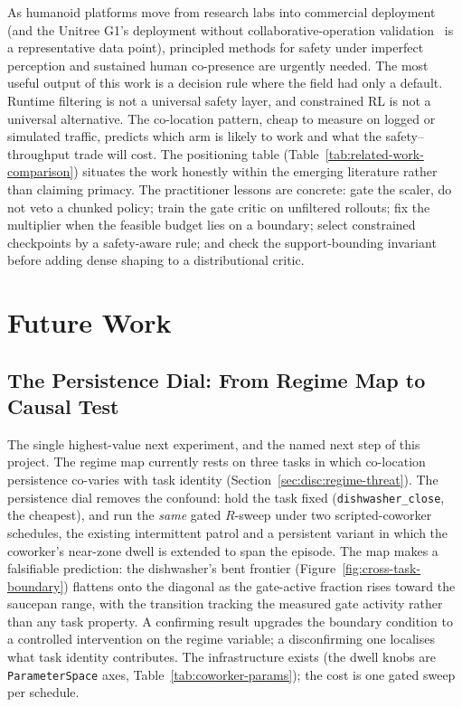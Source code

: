 \documentclass[11pt,a4paper]{report}
\begin{document}
\noindent
As humanoid platforms move from research labs into commercial
deployment (and the Unitree G1's deployment without
collaborative-operation validation~\cite{unitree_g1,hartmann2026iso}
is a representative data point),
principled methods for safety under imperfect perception and
sustained human co-presence are urgently needed. The most useful
output of this work is a decision rule where the field had only a
default. Runtime filtering is not a universal safety layer, and
constrained RL is not a universal alternative. The co-location
pattern, cheap to measure on logged or simulated traffic, predicts
which arm is likely to work and what the safety--throughput trade will
cost. The positioning table
(Table~\ref{tab:related-work-comparison}) situates the work honestly
within the emerging literature rather than claiming primacy. The
practitioner lessons are concrete: gate the scaler, do not veto a
chunked policy; train the gate critic on unfiltered rollouts; fix the
multiplier when the feasible budget lies on a boundary; select
constrained checkpoints by a safety-aware rule; and check the
support-bounding invariant before adding dense shaping to a
distributional critic.


\section{Future Work}
\label{ch:future}
\label{sec:conclusion:fw}

\subsection{The Persistence Dial: From Regime Map to Causal Test}
\label{sec:fw:persistence-dial}

The single highest-value next experiment, and the named next step of
this project. The regime map currently rests on three tasks in which
co-location persistence co-varies with task identity
(Section~\ref{sec:disc:regime-threat}). The persistence dial removes
the confound: hold the task fixed (\texttt{dishwasher\_close}, the
cheapest), and run the \emph{same} gated $R$-sweep under two
scripted-coworker schedules, the existing intermittent patrol and a
persistent variant in which the coworker's near-zone dwell is
extended to span the episode. The map makes a falsifiable
prediction: the dishwasher's bent frontier
(Figure~\ref{fig:cross-task-boundary}) flattens onto the diagonal as
the gate-active fraction rises toward the saucepan range, with the
transition tracking the measured gate activity rather than any task
property. A confirming result upgrades the boundary condition to a
controlled intervention on the regime variable; a disconfirming one
localises what task identity contributes. The infrastructure exists
(the dwell knobs are \texttt{ParameterSpace} axes,
Table~\ref{tab:coworker-params}); the cost is one gated sweep per
schedule.
\end{document}
